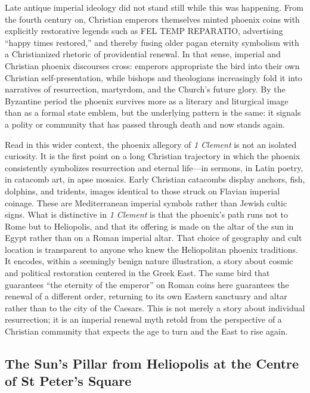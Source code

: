 Late antique imperial ideology did not stand still while this was happening.
From the fourth century on, Christian emperors themselves minted phoenix coins with explicitly restorative legends such as FEL TEMP REPARATIO, advertising ``happy times restored,'' and thereby fusing older pagan eternity symbolism with a Christianized rhetoric of providential renewal.
In that sense, imperial and Christian phoenix discourses cross: emperors appropriate the bird into their own Christian self-presentation, while bishops and theologians increasingly fold it into narratives of resurrection, martyrdom, and the Church's future glory.
By the Byzantine period the phoenix survives more as a literary and liturgical image than as a formal state emblem, but the underlying pattern is the same: it signals a polity or community that has passed through death and now stands again.

Read in this wider context, the phoenix allegory of \emph{1 Clement} is not an isolated curiosity.
It is the first point on a long Christian trajectory in which the phoenix consistently symbolizes resurrection and eternal life---in sermons, in Latin poetry, in catacomb art, in apse mosaics.
Early Christian catacombs display anchors, fish, dolphins, and tridents, images identical to those struck on Flavian imperial coinage.
These are Mediterranean imperial symbols rather than Jewish cultic signs.
What is distinctive in \emph{1 Clement} is that the phoenix's path runs not to Rome but to Heliopolis, and that its offering is made on the altar of the sun in Egypt rather than on a Roman imperial altar.
That choice of geography and cult location is transparent to anyone who knew the Heliopolitan phoenix traditions.
It encodes, within a seemingly benign nature illustration, a story about cosmic and political restoration centered in the Greek East.
The same bird that guarantees ``the eternity of the emperor'' on Roman coins here guarantees the renewal of a different order, returning to its own Eastern sanctuary and altar rather than to the city of the Caesars.
This is not merely a story about individual resurrection; it is an imperial renewal myth retold from the perspective of a Christian community that expects the age to turn and the East to rise again.

\subsection{The Sun's Pillar from Heliopolis at the Centre of St Peter's Square}\label{subsec:vatican-obelisk-sun-pillar}


